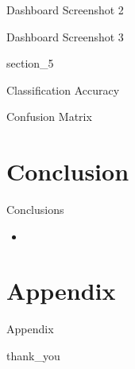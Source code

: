\begin{frame}{Dashboard Screenshot 2}

\end{frame}

\begin{frame}{Dashboard Screenshot 3}

\end{frame}

{
{section_5}
\begin{frame}[plain]
\end{frame}
}

\begin{frame}{Classification Accuracy}

\end{frame}

\begin{frame}{Confusion Matrix}

\end{frame}

\section{Conclusion}

\begin{frame}{Conclusions}
    \begin{itemize}
        \item
    \end{itemize}
\end{frame}

\section{Appendix}

\begin{frame}{Appendix}

\end{frame}

{
{thank_you}
\begin{frame}[plain]
\end{frame}
}

